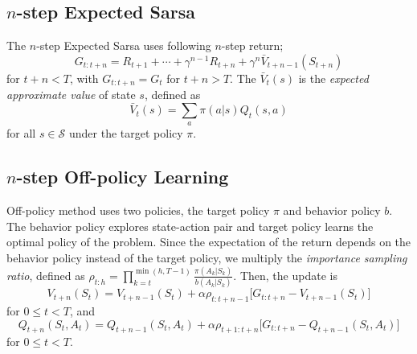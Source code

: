 \documentclass[../../main.tex]{subfiles}
\begin{document}
    \subsection{$n$-step Expected Sarsa}
        The $n$-step Expected Sarsa uses following $n$-step return;
        \begin{equation}
            G_{t:t+n} = R_{t+1} + \cdots + \gamma^{n-1}R_{t+n} + \gamma^n \bar{V}_{t+n-1}(S_{t+n})
        \end{equation}
        for $t+n < T$, with $G_{t:t+n}=G_t$ for $t+n>T$. The $\bar{V}_{t}(s)$ is the \emph{expected approximate value} of state $s$, defined as
        \begin{equation}
            \bar{V}_t(s) = \sum_a \pi(a|s)Q_t(s,a)
        \end{equation}
        for all $s \in \mathcal{S}$ under the target policy $\pi$.

    \subsection{$n$-step Off-policy Learning}
        Off-policy method uses two policies, the target policy $\pi$ and behavior policy $b$. The behavior policy explores state-action pair and
        target policy learns the optimal policy of the problem. Since the expectation of the return depends on the behavior policy instead of the target policy,
        we multiply the \emph{importance sampling ratio}, defined as $\rho_{t:h}=\prod_{k=t}^{\min(h,T-1)}\frac{\pi(A_k|S_k)}{b(A_k|S_k)}$.
        Then, the update is
        \begin{equation}
            V_{t+n}(S_t) = V_{t+n-1}(S_t) + \alpha\rho_{t:t+n-1}\Big[ G_{t:t+n} - V_{t+n-1}(S_t) \Big]
        \end{equation}
        for $0 \leq t < T$, and
        \begin{equation}
            Q_{t+n}(S_t,A_t) = Q_{t+n-1}(S_t,A_t) + \alpha \rho_{t+1:t+n}\Big[ G_{t:t+n} - Q_{t+n-1}(S_t,A_t) \Big]
        \end{equation}
        for $0 \leq t < T$.
\end{document}

